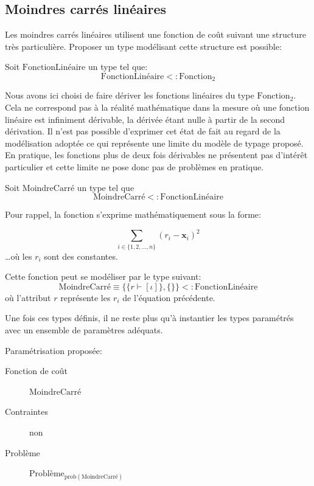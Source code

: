 \subsection{Moindres carrés linéaires}

Les moindres carrés linéaires
utilisent une fonction de coût suivant une structure très
particulière. Proposer un type modélisant cette structure est
possible:

\begin{mydef}\label{ex:chap1_linearfct}
  Soit $\text{FonctionLinéaire}$ un type tel que:
  $$\text{FonctionLinéaire} <: \text{Fonction}_2$$
\end{mydef}

Nous avons ici choisi de faire dériver les fonctions
linéaires du type $\text{Fonction}_2$. Cela
ne correspond pas à la réalité mathématique dans la mesure où une
fonction linéaire est infiniment dérivable, la dérivée étant nulle à
partir de la second dérivation. Il n'est pas possible d'exprimer cet
état de fait au regard de la modélisation adoptée ce qui représente
une limite du modèle de typage proposé. En pratique, les fonctions
plus de deux fois dérivables ne présentent pas d'intérêt particulier
et cette limite ne pose donc pas de problèmes en pratique.

\begin{mydef}\label{ex:chap1_leastsquarefct}
  Soit $\text{MoindreCarré}$ un type tel que
  $$\text{MoindreCarré} <: \text{FonctionLinéaire}$$

  Pour rappel, la fonction s'exprime mathématiquement sous la forme:

  \begin{equation}
    \sum_{i \in \{1, 2, \dotsc, n\}} (r_i - \mathbf{x}_i)^2
  \end{equation}
  \ldots où les $r_i$ sont des constantes.

  Cette fonction peut se modéliser par le type suivant:
  \begin{equation}
    \text{MoindreCarré} \equiv \{ \{ r \vdash [\iota] \}, \{ \} \} <: \text{FonctionLinéaire}
  \end{equation}
  où l'attribut $r$ représente les $r_i$ de l'équation précédente.
\end{mydef}


Une fois ces types définis, il ne reste plus qu'à instantier les types
paramétrés avec un ensemble de paramètres adéquats.

\begin{myexample}\label{ex:chap1_leastsquare}
  Paramétrisation proposée:
  \begin{description}
  \item[Fonction de coût] $\text{MoindreCarré}$
  \item[Contraintes] non
  \item[Problème] $\text{Problème}_{\text{prob}(\text{MoindreCarré})}$
  \end{description}
\end{myexample}


